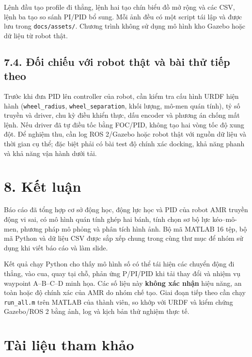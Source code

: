 \documentclass[
  12pt,
  a4paper,
]{article}
\begin{document}
Lệnh đầu tạo profile đi thẳng, lệnh hai tạo chín biểu đồ mở rộng và các
CSV, lệnh ba tạo so sánh PI/PID bổ sung. Mỗi ảnh đều có một script tái
lập và được lưu trong \texttt{docs/assets/}. Chương trình không sử dụng
mô hình kho Gazebo hoặc dữ liệu từ robot thật.

\subsection{7.4. Đối chiếu với robot thật và bài thử tiếp
theo}\label{ux111ux1ed1i-chiux1ebfu-vux1edbi-robot-thux1eadt-vuxe0-buxe0i-thux1eed-tiux1ebfp-theo}

Trước khi đưa PID lên controller của robot, cần kiểm tra cấu hình URDF
hiện hành (\texttt{wheel\_radius}, \texttt{wheel\_separation}, khối
lượng, mô-men quán tính), tỷ số truyền và driver, chu kỳ điều khiển
thực, dấu encoder và phương án chống mất lệnh. Nếu driver đã tự điều tốc
bằng FOC/PID, không tạo hai vòng tốc độ xung đột. Để nghiệm thu, cần log
ROS 2/Gazebo hoặc robot thật với nguồn dữ liệu và thời gian cụ thể; đặc
biệt phải có bài test độ chính xác docking, khả năng phanh và khả năng
vận hành dưới tải.

\section{8. Kết luận}\label{kux1ebft-luux1eadn}

Báo cáo đã tổng hợp cơ sở động học, động lực học và PID của robot AMR
truyền động vi sai, có mô hình quán tính ghép hai bánh, tính chọn sơ bộ
lực kéo--mô-men, phương pháp mô phỏng và phân tích hình ảnh. Bộ mã
MATLAB 16 tệp, bộ mã Python và dữ liệu CSV được sắp xếp chung trong cùng
thư mục để nhóm sử dụng khi viết báo cáo và làm slide.

Kết quả chạy Python cho thấy mô hình số có thể tái hiện các chuyển động
đi thẳng, vào cua, quay tại chỗ, phản ứng P/PI/PID khi tải thay đổi và
nhiệm vụ waypoint A--B--C--D minh họa. Các số liệu này \textbf{không xác
nhận} hiệu năng, an toàn hoặc độ chính xác của AMR do nhóm chế tạo. Giai
đoạn tiếp theo cần chạy \texttt{run\_all.m} trên MATLAB của thành viên,
so khớp với URDF và kiểm chứng Gazebo/ROS 2 bằng ảnh, log và kịch bản
thử nghiệm thực tế.

\section{Tài liệu tham khảo}\label{tuxe0i-liux1ec7u-tham-khux1ea3o}
\end{document}
